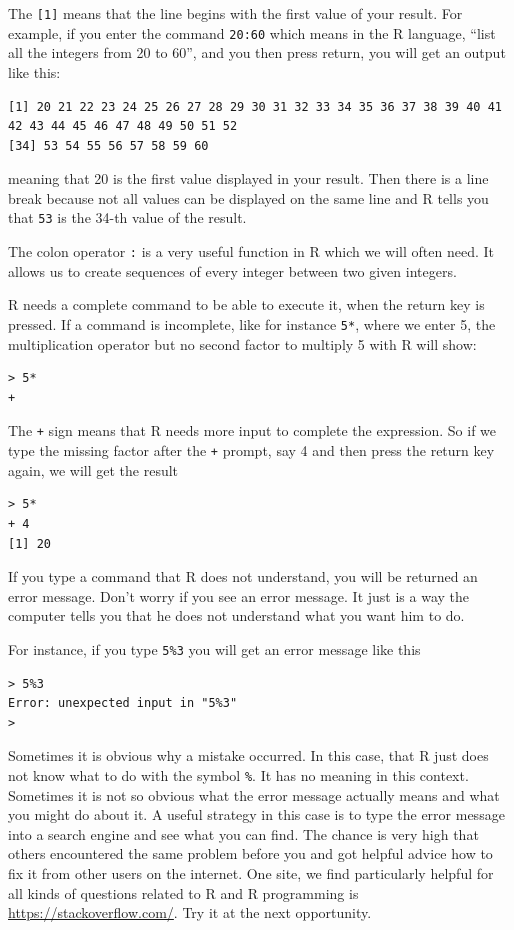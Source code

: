 \documentclass[
]{book}
\begin{document}
The \texttt{{[}1{]}} means that the line begins with the first value of your result. For
example, if you enter the command \texttt{20:60} which means in the R language, ``list
all the integers from 20 to 60'', and you then press return, you will get an output like this:

\begin{verbatim}
[1] 20 21 22 23 24 25 26 27 28 29 30 31 32 33 34 35 36 37 38 39 40 41 42 43 44 45 46 47 48 49 50 51 52
[34] 53 54 55 56 57 58 59 60
\end{verbatim}

meaning that 20 is the first value displayed in your result. Then there is a
line break because not
all values can be displayed on the same line and R tells you that \texttt{53} is the
34-th value of the
result.

The colon operator \texttt{:} is a very useful function in R which we will often need. It allows us
to create sequences of every integer between two given integers.

R needs a complete command to be able to execute it, when the return key is pressed.
If a command is incomplete,
like for instance
\texttt{5*},
where we enter 5, the multiplication operator but no
second factor to multiply 5 with R will show:

\begin{verbatim}
> 5*
+ 
\end{verbatim}

The \texttt{+} sign means that R needs more input to complete the expression.
So if we type the missing
factor after the \texttt{+} prompt, say 4 and then press the return key again, we
will get the result

\begin{verbatim}
> 5*
+ 4
[1] 20
\end{verbatim}

If you type a command that R does not understand, you will be returned an error message.
Don't worry
if you see an error message. It just is a way the computer tells you that he does
not understand what you
want him to do.

For instance, if you type \texttt{5\%3} you will get an error message like this

\begin{verbatim}
> 5%3
Error: unexpected input in "5%3"
>
\end{verbatim}

Sometimes it is obvious why a mistake occurred. In this case, that R just does not
know what to do with
the symbol \texttt{\%}. It has no meaning in this context. Sometimes it is
not so obvious what the error
message actually means and what you might do about it. A useful strategy in this
case is to type
the error message into a search engine and see what you can find. The chance is very
high that others
encountered the same problem before you and got helpful advice how to fix it from other users on
the internet. One site, we find particularly helpful for all kinds of questions related to R
and R programming is \url{https://stackoverflow.com/}. Try it at the next opportunity.
\end{document}

